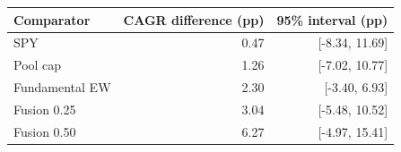 \begin{tabular}{lrr}
\toprule
Comparator & CAGR difference (pp) & 95\% interval (pp) \\
\midrule
SPY & 0.47 & [-8.34, 11.69] \\
Pool cap & 1.26 & [-7.02, 10.77] \\
Fundamental EW & 2.30 & [-3.40, 6.93] \\
Fusion 0.25 & 3.04 & [-5.48, 10.52] \\
Fusion 0.50 & 6.27 & [-4.97, 15.41] \\
\bottomrule
\end{tabular}
